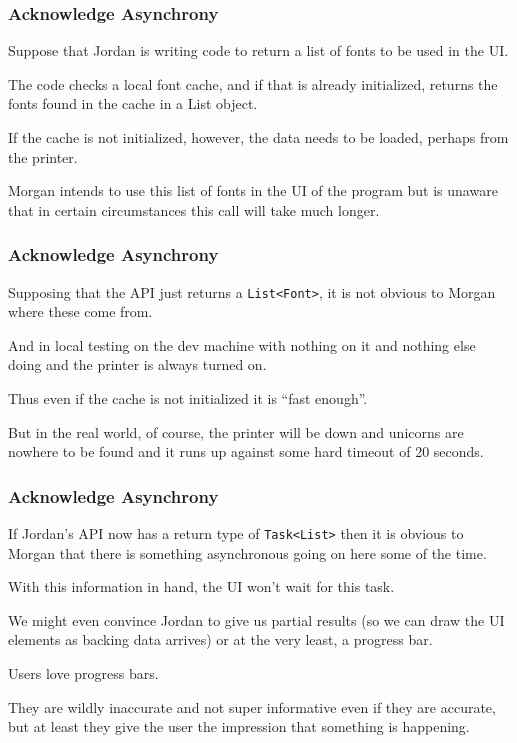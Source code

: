 \begin{frame}
\frametitle{Acknowledge Asynchrony}

Suppose that Jordan is writing code to return a list of fonts to be used in the UI. 

The code checks a local font cache, and if that is already initialized, returns the fonts found in the cache in a List object. 

If the cache is not initialized, however, the data needs to be loaded, perhaps from the printer. 

Morgan intends to use this list of fonts in the UI of the program but is unaware that in certain circumstances this call will take much longer.

\end{frame}



\begin{frame}
\frametitle{Acknowledge Asynchrony}

Supposing that the API just returns a \texttt{List<Font>}, it is not obvious to Morgan where these come from. 

And in local testing on the dev machine with nothing on it and nothing else doing and the printer is always turned on.

Thus even if the cache is not initialized it is ``fast enough''. 

But in the real world, of course, the printer will be down and unicorns are nowhere to be found and it runs up against some hard timeout of 20 seconds. 

\end{frame}



\begin{frame}
\frametitle{Acknowledge Asynchrony}

If Jordan's API now has a return type of \texttt{Task<List>} then it is obvious to Morgan that there is something asynchronous going on here some of the time. 

With this information in hand, the UI won't wait for this task. 

We might even convince Jordan to give us partial results (so we can draw the UI elements as backing data arrives) or at the very least, a progress bar. 

Users love progress bars. 

They are wildly inaccurate and not super informative even if they are accurate, but at least they give the user the impression that something is happening.

\end{frame}

